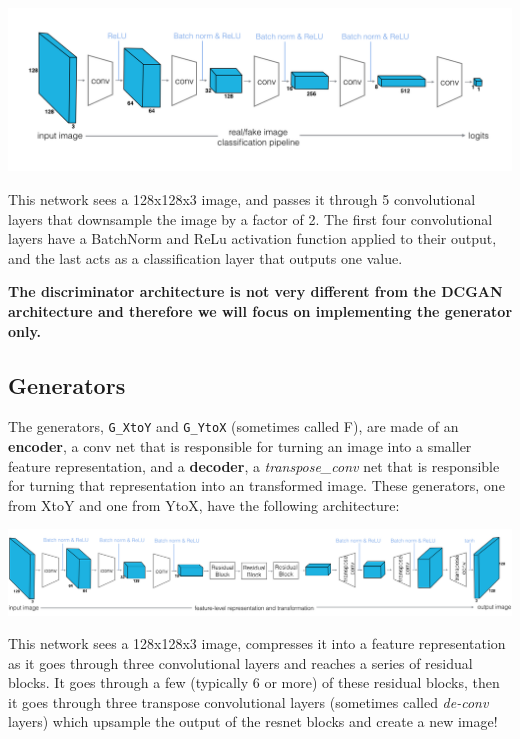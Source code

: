 \includegraphics[width=1\linewidth]{img//genAdvNet//image2image/discriminator_layers.png}

This network sees a 128x128x3 image, and passes it through 5
convolutional layers that downsample the image by a factor of 2. The
first four convolutional layers have a BatchNorm and ReLu activation
function applied to their output, and the last acts as a classification
layer that outputs one value. \newline

\textbf{The discriminator architecture is not very different from the
DCGAN architecture and therefore we will focus on implementing the
generator only.}
\subsection{Generators}
The generators, \lstinline{G_XtoY} and
\lstinline{G_YtoX} (sometimes called F), are made of an
\textbf{encoder}, a conv net that is responsible for turning an image
into a smaller feature representation, and a \textbf{decoder}, a
\emph{transpose\_conv} net that is responsible for turning that
representation into an transformed image. These generators, one from
XtoY and one from YtoX, have the following architecture:

\includegraphics[width=1\linewidth]{img//genAdvNet//image2image/cyclegan_generator_ex.png}

This network sees a 128x128x3 image, compresses it into a feature
representation as it goes through three convolutional layers and reaches
a series of residual blocks. It goes through a few (typically 6 or more)
of these residual blocks, then it goes through three transpose
convolutional layers (sometimes called \emph{de-conv} layers) which
upsample the output of the resnet blocks and create a new image! \newline


